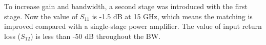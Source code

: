 To increase gain and bandwidth, a second stage was introduced with the first stage. Now the value of $S_{11}$ is -1.5 dB at 15 GHz, which means the matching is improved compared with a single-stage power amplifier. The value of input return loss ($S_{12}$) is less than -50 dB throughout the BW.

